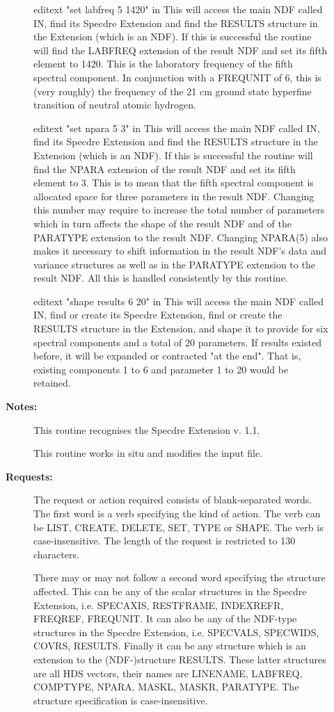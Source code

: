 \begin{description}
\begin{description}
\begin{terminalv}
editext "set labfreq 5 1420" in
   This will access the main NDF called IN, find its Specdre Extension
   and find the RESULTS structure in the Extension (which is an
   NDF). If this is successful the routine will find the LABFREQ
   extension of the result NDF and set its fifth element to 1420.
   This is the laboratory frequency of the fifth spectral
   component. In conjunction with a FREQUNIT of 6, this is
   (very roughly) the frequency of the 21 cm ground state
   hyperfine transition of neutral atomic hydrogen.

editext "set npara 5 3" in
   This will access the main NDF called IN, find its Specdre Extension
   and find the RESULTS structure in the Extension (which is an
   NDF). If this is successful the routine will find the NPARA
   extension of the result NDF and set its fifth element to 3.
   This is to mean that the fifth spectral component is allocated
   space for three parameters in the result NDF. Changing this
   number may require to increase the total number of parameters
   which in turn affects the shape of the result NDF and of the
   PARATYPE extension to the result NDF. Changing NPARA(5) also
   makes it necessary to shift information in the result NDF's
   data and variance structures as well as in the PARATYPE
   extension to the result NDF. All this is handled consistently by
   this routine.

editext "shape results 6 20" in
   This will access the main NDF called IN, find or create its Specdre
   Extension, find or create the RESULTS structure in the
   Extension, and shape it to provide for six spectral components
   and a total of 20 parameters. If results existed before, it
   will be expanded or contracted "at the end". That is, existing
   components 1 to 6 and parameter 1 to 20 would be retained.
\end{terminalv}

\item [\textbf{Notes:}]
This routine recognises the Specdre Extension v. 1.1.

This routine works in situ and modifies the input file.

\item [\textbf{Requests:}]
   The request or action required consists of blank-separated
   words. The first word is a verb specifying the kind of action.
   The verb can be LIST, CREATE, DELETE, SET, TYPE or SHAPE. The
   verb is case-insensitive. The length of the request is
   restricted to 130 characters.

   There may or may not follow a second word specifying the
   structure affected. This can be any of the scalar structures in
   the Specdre Extension, i.e. SPECAXIS, RESTFRAME, INDEXREFR,
   FREQREF, FREQUNIT. It can also be any of the NDF-type structures
   in the Specdre Extension, i.e. SPECVALS, SPECWIDS, COVRS, RESULTS.
   Finally it can be any structure which is an extension to the
   (NDF-)structure RESULTS. These latter structures are all HDS
   vectors, their names are LINENAME, LABFREQ, COMPTYPE, NPARA,
   MASKL, MASKR, PARATYPE. The structure specification is
   case-insensitive.


\end{description}
\end{description}
